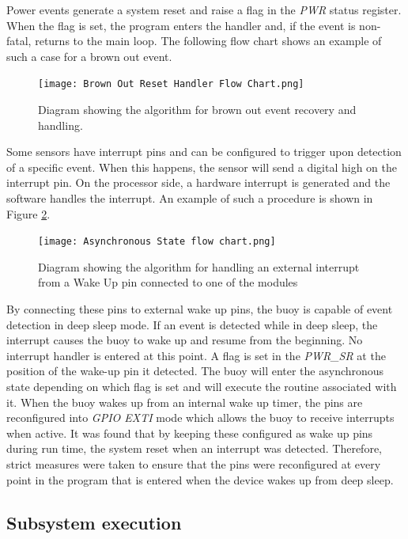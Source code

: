 Power events generate a system reset and raise a flag in the \textit{PWR} status register. When the flag is set, the program enters the handler and, if the event is non-fatal, returns to the main loop. The following flow chart shows an example of such a case for a brown out event.

\begin{figure}[H]
	\centering
	\texttt{[image: Brown Out Reset Handler Flow Chart.png]}
	\caption{Diagram showing the algorithm for brown out event recovery and handling.}
	\label{fig:evt_handle}
\end{figure}

Some sensors have interrupt pins and can be configured to trigger upon detection of a specific event. When this happens, the sensor will send a digital high on the interrupt pin. On the processor side, a hardware interrupt is generated and the software handles the interrupt. An example of such a procedure is shown in Figure \ref{fig:int_handle}.

\begin{figure}[H]
	\centering
	\texttt{[image: Asynchronous State flow chart.png]}
	\caption{Diagram showing the algorithm for handling an external interrupt from a Wake Up pin connected to one of the modules}
	\label{fig:int_handle}
\end{figure}

By connecting these pins to external wake up pins, the buoy is capable of event detection in deep sleep mode. If an event is detected while in deep sleep, the interrupt causes the buoy to wake up and resume from the beginning. No interrupt handler is entered at this point. A flag is set in the \textit{PWR\_SR} at the position of the wake-up pin it detected. The buoy will enter the asynchronous state depending on which flag is set and will execute the routine associated with it. When the buoy wakes up from an internal wake up timer, the pins are reconfigured into \textit{GPIO EXTI} mode which allows the buoy to receive interrupts when active. It was found that by keeping these configured as wake up pins during run time, the system reset when an interrupt was detected. Therefore, strict measures were taken to ensure that the pins were reconfigured at every point in the program that is entered when the device wakes up from deep sleep.

\subsection{Subsystem execution}

